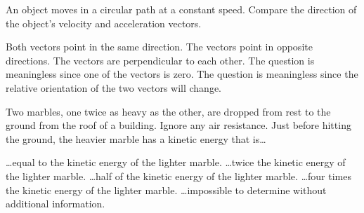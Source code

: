 \documentclass[letterpaper,addpoints,answers]{exam}
\begin{document}
\begin{questions}
\begin{question}[5]
An object moves in a circular path at a constant speed. Compare the direction of the object's velocity and acceleration vectors.
\begin{checkboxes}
 \choice Both vectors point in the same direction.
 \choice The vectors point in opposite directions.
 \correctchoice The vectors are perpendicular to each other.
 \choice The question is meaningless since one of the vectors is zero.
 \choice The question is meaningless since the relative orientation of the two vectors will change.
\end{checkboxes}
\end{question}

\begin{question}[5]
Two marbles, one twice as heavy as the other, are dropped from rest to the ground from the roof of a building. Ignore any air resistance. Just before hitting the ground, the heavier marble has a kinetic energy that is\ldots
\begin{checkboxes}
 \choice \ldots equal to the kinetic energy of the lighter marble.
 \correctchoice \ldots twice the kinetic energy of the lighter marble.
 \choice \ldots half of the kinetic energy of the lighter marble.
 \choice \ldots four times the kinetic energy of the lighter marble.
 \choice \ldots impossible to determine without additional information.
\end{checkboxes}
\end{question}

\pagebreak



\end{questions}
\end{document}
